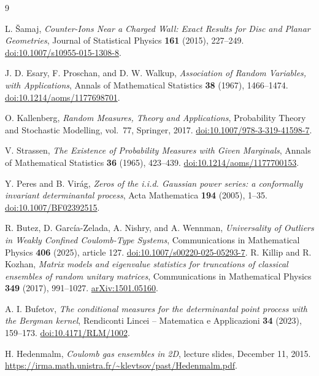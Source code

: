 \documentclass[11pt,a4paper]{article}
\numberwithin{equation}{section}
\theoremstyle{definition}
\theoremstyle{remark}
\begin{document}
\begin{thebibliography}{9}
\raggedright
{}
L. \v{S}amaj,
\emph{Counter-Ions Near a Charged Wall: Exact Results for Disc and Planar
Geometries}, Journal of Statistical Physics \textbf{161} (2015), 227--249.
\href{https://doi.org/10.1007/s10955-015-1308-8}{doi:10.1007/s10955-015-1308-8}.

J. D. Esary, F. Proschan, and D. W. Walkup,
\emph{Association of Random Variables, with Applications},
Annals of Mathematical Statistics \textbf{38} (1967), 1466--1474.
\href{https://doi.org/10.1214/aoms/1177698701}{doi:10.1214/aoms/1177698701}.

O. Kallenberg,
\emph{Random Measures, Theory and Applications},
Probability Theory and Stochastic Modelling, vol.~77, Springer, 2017.
\href{https://doi.org/10.1007/978-3-319-41598-7}{doi:10.1007/978-3-319-41598-7}.

V. Strassen,
\emph{The Existence of Probability Measures with Given Marginals},
Annals of Mathematical Statistics \textbf{36} (1965), 423--439.
\href{https://doi.org/10.1214/aoms/1177700153}{doi:10.1214/aoms/1177700153}.

Y. Peres and B. Vir\'ag,
\emph{Zeros of the i.i.d. Gaussian power series: a conformally invariant
determinantal process}, Acta Mathematica \textbf{194} (2005), 1--35.
\href{https://doi.org/10.1007/BF02392515}{doi:10.1007/BF02392515}.

R. Butez, D. Garc\'ia-Zelada, A. Nishry, and A. Wennman,
\emph{Universality of Outliers in Weakly Confined Coulomb-Type Systems},
Communications in Mathematical Physics \textbf{406} (2025), article 127.
\href{https://doi.org/10.1007/s00220-025-05293-7}{doi:10.1007/s00220-025-05293-7}.
R. Killip and R. Kozhan,
\emph{Matrix models and eigenvalue statistics for truncations of classical
ensembles of random unitary matrices},
Communications in Mathematical Physics \textbf{349} (2017), 991--1027.
\href{https://arxiv.org/abs/1501.05160}{arXiv:1501.05160}.


A. I. Bufetov,
\emph{The conditional measures for the determinantal point process with
the Bergman kernel}, Rendiconti Lincei -- Matematica e Applicazioni
\textbf{34} (2023), 159--173.
\href{https://doi.org/10.4171/RLM/1002}{doi:10.4171/RLM/1002}.


H. Hedenmalm,
\emph{Coulomb gas ensembles in 2D}, lecture slides, December 11, 2015.
\url{https://irma.math.unistra.fr/~klevtsov/past/Hedenmalm.pdf}.

\end{thebibliography}
\end{document}
